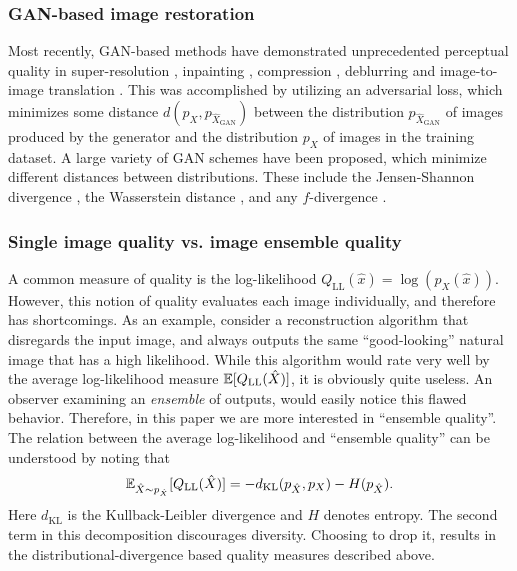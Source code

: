 \subsubsection*{GAN-based image restoration}
Most recently, GAN-based methods have demonstrated unprecedented perceptual quality in super-resolution \cite{ledig2016photo,sajjadi2017enhancenet,wang2018esrgan,shaham2019singan}, inpainting \cite{pathak2016context,yeh2017semantic,yu2018generative}, compression \cite{rippel2017real,agustsson2018generative,tschannen2018deep}, deblurring \cite{kupyn2018deblurgan} and image-to-image translation \cite{isola2016image,zhu2017unpaired,liu2017unsupervised}. This was accomplished by utilizing an adversarial loss, which minimizes some distance $d(p_X,p_{\hat{X}_{\text{GAN}}})$ between the distribution $p_{\hat{X}_{\text{GAN}}}$ of images produced by the generator and the distribution $p_X$ of images in the training dataset. A large variety of GAN schemes have been proposed, which minimize different distances between distributions. These include the Jensen-Shannon divergence \cite{goodfellow2014generative}, the Wasserstein distance \cite{arjovsky2017wasserstein}, and any $f$-divergence \cite{nowozin2016f}.

\subsubsection*{Single image quality vs. image ensemble quality}
A common measure of quality is the log-likelihood $Q_{\text{LL}}(\hat{x}) = \log (p_X(\hat{x}))$. However, this notion of quality evaluates each image individually, and therefore has shortcomings. As an example, consider a reconstruction algorithm that disregards the input image, and always outputs the same ``good-looking'' natural image that has a high likelihood. While this algorithm would rate very well by the average log-likelihood measure $\mathbb{E}[Q_{\text{LL}}(\hat{X})]$, it is obviously quite useless. An observer examining an \emph{ensemble} of outputs, would easily notice this flawed behavior. Therefore, in this paper we are more interested in ``ensemble quality''. The relation between the average log-likelihood and ``ensemble quality'' can be understood by noting that
\begin{equation}
\mathbb{E}_{\hat{X}\sim p_{\hat{X}}}[Q_{\text{LL}}(\hat{X})]=-d_{\text{KL}}(p_{\hat{X}},p_X) - H(p_{\hat{X}}).
\end{equation}
Here $d_{\text{KL}}$ is the Kullback-Leibler divergence and $H$ denotes entropy. The second term in this decomposition discourages diversity. %
Choosing to drop it, results in the distributional-divergence based quality measures described above.
